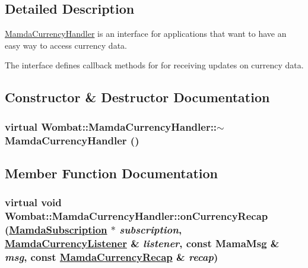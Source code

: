 \subsection{Detailed Description}
\hyperlink{classWombat_1_1MamdaCurrencyHandler}{Mamda\-Currency\-Handler} is an interface for applications that want to have an easy way to access currency data. 

The interface defines callback methods for for receiving updates on currency data. 



\subsection{Constructor \& Destructor Documentation}
\hypertarget{classWombat_1_1MamdaCurrencyHandler_4a7db6d54b97ad559a46654cef8f2356}{
\subsubsection[$\sim$MamdaCurrencyHandler]{\setlength{\rightskip}{0pt plus 5cm}virtual Wombat::Mamda\-Currency\-Handler::$\sim$Mamda\-Currency\-Handler ()}}
\label{classWombat_1_1MamdaCurrencyHandler_4a7db6d54b97ad559a46654cef8f2356}




\subsection{Member Function Documentation}
\hypertarget{classWombat_1_1MamdaCurrencyHandler_f267714c669e651a19294a5574c73156}{
\subsubsection[onCurrencyRecap]{\setlength{\rightskip}{0pt plus 5cm}virtual void Wombat::Mamda\-Currency\-Handler::on\-Currency\-Recap (\hyperlink{classWombat_1_1MamdaSubscription}{Mamda\-Subscription} $\ast$ {\em subscription}, \hyperlink{classWombat_1_1MamdaCurrencyListener}{Mamda\-Currency\-Listener} \& {\em listener}, const Mama\-Msg \& {\em msg}, const \hyperlink{classWombat_1_1MamdaCurrencyRecap}{Mamda\-Currency\-Recap} \& {\em recap})}}
\label{classWombat_1_1MamdaCurrencyHandler_f267714c669e651a19294a5574c73156}


